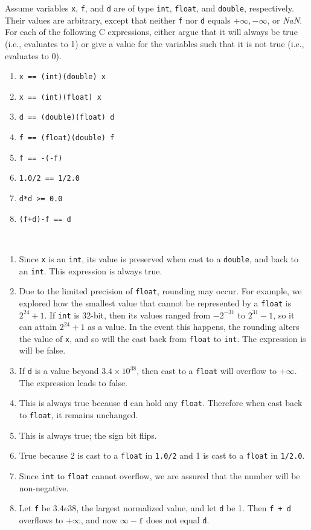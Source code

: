 \documentclass[12pt]{article}
\newenvironment{ex}[2][Exercise]{\begin{trivlist}
		\item[\hskip \labelsep {\bfseries #1}\hskip \labelsep {\bfseries #2.}]}{\end{trivlist}}
\newenvironment{sol}[1][Solution]{\begin{trivlist}
		\item[\hskip \labelsep {\bfseries #1:}]}{\end{trivlist}}
\begin{document}
\begin{ex}{2.54}
	Assume variables \texttt{x}, \texttt{f}, and \texttt{d} are of type \texttt{int},
	\texttt{float}, and \texttt{double}, respectively. Their values are arbitrary,
	except that neither \texttt{f} nor \texttt{d} equals $+\infty, -\infty$, or
	\emph{NaN}. For each of the following C expressions, either argue that it will
	always be true (i.e., evaluates to 1) or give a value for the variables such that
	it is not true (i.e., evaluates to 0).
	\begin{enumerate}[label=(\alph*)]
		\item \texttt{x == (int)(double) x}
		\item \texttt{x == (int)(float) x}
		\item \texttt{d == (double)(float) d}
		\item \texttt{f == (float)(double) f}
		\item \texttt{f == -(-f)}
		\item \texttt{1.0/2 == 1/2.0}
		\item \texttt{d*d >= 0.0}
		\item \texttt{(f+d)-f == d}
	\end{enumerate}
\end{ex}

\begin{sol}
	\
	\begin{enumerate}[label=(\alph*)]
		\item Since \texttt{x} is an \texttt{int}, its value is preserved when cast to
		a \texttt{double}, and back to an \texttt{int}. This expression is always true.
		\item Due to the limited precision of \texttt{float}, rounding may occur. For
		example, we explored how the smallest value that cannot be represented by a
		\texttt{float} is $2^{24}+1$. If \texttt{int} is 32-bit, then its values
		ranged from $-2^{-31}$ to $2^{31}-1$, so it can attain $2^{24}+1$ as a value.
		In the event this happens, the rounding alters the value of \texttt{x},
		and so will the cast back from \texttt{float} to \texttt{int}. The expression
		is will be false.
		\item If \texttt{d} is a value beyond $3.4\times 10^{38}$, then cast to a
		\texttt{float} will overflow to $+\infty$. The expression leads to false.
		\item This is always true because \texttt{d} can hold any \texttt{float}.
		Therefore when cast back to \texttt{float}, it remains unchanged.
		\item This is always true; the sign bit flips.
		\item True because 2 is cast to a \texttt{float} in \texttt{1.0/2} and 1 is
		cast to a \texttt{float} in \texttt{1/2.0}.
		\item Since \texttt{int} to \texttt{float} cannot overflow, we are assured
		that the number will be non-negative.
		\item  Let \texttt{f} be $3.4e38$, the largest normalized value, and let
		\texttt{d} be 1. Then \texttt{f + d} overflows to $+\infty$, and now
		$\infty-\texttt{f}$ does not equal \texttt{d}.
	\end{enumerate}
\end{sol}
\end{document}
